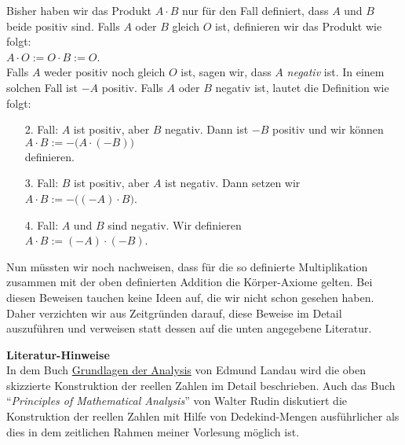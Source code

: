\renewcommand{\labelenumi}{\arabic{enumi}.}
Bisher haben wir das Produkt $A \cdot B$ nur f\"ur den Fall definiert, dass $A$ und $B$ beide positiv
sind.  Falls $A$ oder $B$ gleich $O$ ist, definieren wir das Produkt wie folgt:
\\[0.2cm]
\hspace*{1.3cm}
$A \cdot O := O \cdot B := O$.
\\[0.2cm]
Falls $A$ weder positiv noch gleich $O$ ist, sagen wir, dass $A$  \emph{negativ} ist.  In einem
solchen Fall ist $-\!A$ positiv.  Falls $A$ oder $B$ negativ ist, lautet die Definition wie folgt:
\begin{enumerate}
\item[2.] Fall: $A$ ist positiv, aber $B$ negativ.  Dann ist $-\!B$ positiv und wir k\"onnen
          \\[0.2cm]
          \hspace*{1.3cm}
          $A \cdot B := -\!\bigl(A \cdot (-\!B)\bigr)$
          \\[0.2cm]
          definieren.
\item[3.] Fall: $B$ ist positiv, aber $A$ ist negativ.  Dann setzen wir
          \\[0.2cm]
          \hspace*{1.3cm}
          $A \cdot B := -\!\bigl((-\!A) \cdot B\bigr)$.
\item[4.] Fall: $A$ und $B$ sind negativ.  Wir definieren
          \\[0.2cm]
          \hspace*{1.3cm}
          $A \cdot B := (-\!A) \cdot (-\!B)$.
\end{enumerate}
Nun m\"ussten wir noch nachweisen, dass f\"ur die so definierte Multiplikation zusammen mit der oben definierten
Addition die K\"orper-Axiome gelten.  Bei diesen Beweisen tauchen keine Ideen auf, die wir nicht schon gesehen haben.
Daher verzichten wir aus Zeitgr\"unden darauf, diese Beweise im Detail auszuf\"uhren und verweisen statt dessen
auf die unten angegebene Literatur.
\vspace*{0.3cm}

\noindent
\textbf{Literatur-Hinweise} \\
In dem Buch 
\href{http://www.fernuni-hagen.de/imperia/md/content/ausstellung/juedischemathematiker/landau.pdf}{Grundlagen der Analysis} 
von Edmund Landau \cite{landau:1930} wird die oben skizzierte Konstruktion der reellen Zahlen im Detail beschrieben.   
Auch das Buch ``\emph{Principles of  Mathematical Analysis}'' von Walter Rudin \cite{rudin:1976}
diskutiert die Konstruktion der reellen Zahlen mit Hilfe von Dedekind-Mengen ausf\"uhrlicher als dies in
dem zeitlichen Rahmen meiner Vorlesung m\"oglich ist.


